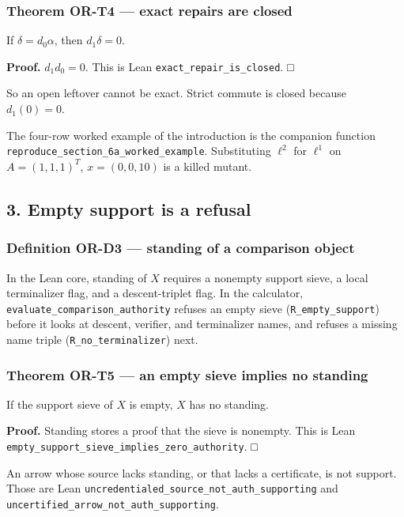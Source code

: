 \documentclass[
  11pt,
]{article}
\begin{document}
\subsubsection{Theorem OR-T4 --- exact repairs are closed}\label{theorem-or-t4-exact-repairs-are-closed}

If \(\delta=d_0\alpha\), then \(d_1\delta=0\).

\textbf{Proof.} \(d_1 d_0=0\). This is Lean \nolinkurl{exact_repair_is_closed}. □

So an open leftover cannot be exact. Strict commute is closed because \(d_1(0)=0\).

The four-row worked example of the introduction is the companion function \nolinkurl{reproduce_section_6a_worked_example}. Substituting \(\ell^2\) for \(\ell^1\) on \(A=(1,1,1)^T\), \(x=(0,0,10)\) is a killed mutant.

\subsection{3. Empty support is a refusal}\label{empty-support-is-a-refusal}

\subsubsection{Definition OR-D3 --- standing of a comparison object}\label{definition-or-d3-standing-of-a-comparison-object}

In the Lean core, standing of \(X\) requires a nonempty support sieve, a local terminalizer flag, and a descent-triplet flag. In the calculator, \nolinkurl{evaluate_comparison_authority} refuses an empty sieve (\texttt{R\_empty\_support}) before it looks at descent, verifier, and terminalizer names, and refuses a missing name triple (\texttt{R\_no\_terminalizer}) next.

\subsubsection{Theorem OR-T5 --- an empty sieve implies no standing}\label{theorem-or-t5-an-empty-sieve-implies-no-standing}

If the support sieve of \(X\) is empty, \(X\) has no standing.

\textbf{Proof.} Standing stores a proof that the sieve is nonempty. This is Lean \nolinkurl{empty_support_sieve_implies_zero_authority}. □

An arrow whose source lacks standing, or that lacks a certificate, is not support. Those are Lean \nolinkurl{uncredentialed_source_not_auth_supporting} and \nolinkurl{uncertified_arrow_not_auth_supporting}.
\end{document}
